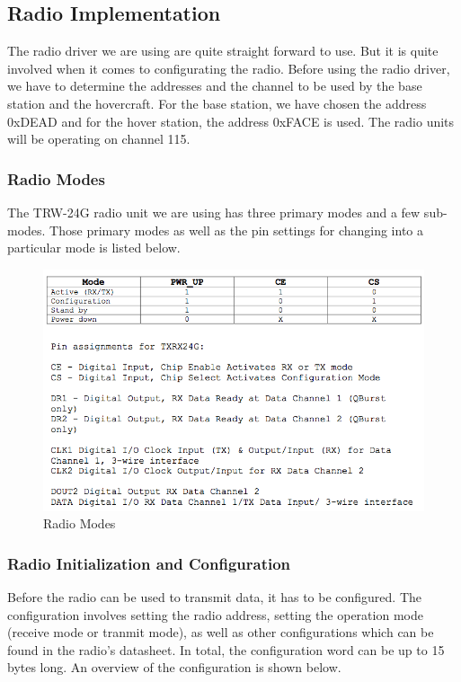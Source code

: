 \subsection{Radio Implementation}
The radio driver we are using are quite straight forward to use. But it is quite involved when it comes to configurating the radio. Before using the radio driver, we have to determine the addresses and the channel to be used by the base station and the hovercraft. For the base station, we have chosen the address 0xDEAD and for the hover station, the address 0xFACE is used. The radio units will be operating on channel 115.

\subsubsection{Radio Modes}
The TRW-24G radio unit we are using has three primary modes and a few sub-modes. Those primary modes as well as the pin settings for changing into a particular mode is listed below.

\begin{figure}[tpb]
  \begin{center}
    \includegraphics[width=125mm]{imageSources/radioModes.png}
  \end{center}
  \caption{Radio Modes} 
  \label{radioModes}
\end{figure}

\subsubsection{Radio Initialization and Configuration}
Before the radio can be used to transmit data, it has to be configured. The configuration involves setting the radio address, setting the operation mode (receive mode or tranmit mode), as well as other configurations which can be found in the radio's datasheet. In total, the configuration word can be up to 15 bytes long. An overview of the configuration is shown below.

